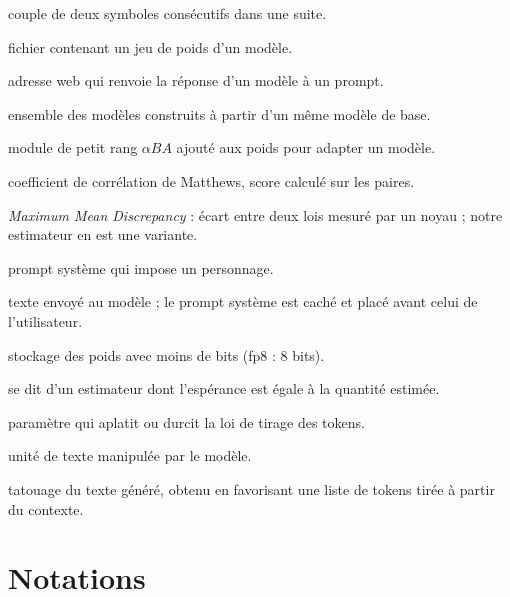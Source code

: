 \documentclass[11pt,a4paper]{report}
\theoremstyle{definition}
\theoremstyle{plain}
\begin{document}
\begin{description}[style=nextline,leftmargin=0.6cm]
  \item[Bigramme] couple de deux symboles consécutifs dans une suite.
  \item[Checkpoint] fichier contenant un jeu de poids d'un modèle.
  \item[Endpoint] adresse web qui renvoie la réponse d'un modèle à un prompt.
  \item[Famille] ensemble des modèles construits à partir d'un même modèle de base.
  \item[LoRA] module de petit rang $\alpha BA$ ajouté aux poids pour adapter un modèle.
  \item[MCC] coefficient de corrélation de Matthews, score calculé sur les paires.
  \item[MMD] \emph{Maximum Mean Discrepancy} : écart entre deux lois mesuré par un noyau ; notre estimateur en est une variante.
  \item[Persona] prompt système qui impose un personnage.
  \item[Prompt (système)] texte envoyé au modèle ; le prompt système est caché et placé avant celui de l'utilisateur.
  \item[Quantization] stockage des poids avec moins de bits (fp8 : 8 bits).
  \item[Sans biais] se dit d'un estimateur dont l'espérance est égale à la quantité estimée.
  \item[Température] paramètre qui aplatit ou durcit la loi de tirage des tokens.
  \item[Token] unité de texte manipulée par le modèle.
  \item[Watermark] tatouage du texte généré, obtenu en favorisant une liste de tokens tirée à partir du contexte.
\end{description}

\chapter{Notations}
\end{document}
